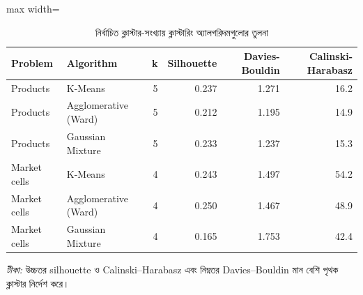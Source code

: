 \begin{table}[htbp]
\centering
\small
\caption{নির্বাচিত ক্লাস্টার-সংখ্যায় ক্লাস্টারিং অ্যালগরিদমগুলোর তুলনা}
\label{tab:clustercompare}
\begin{adjustbox}{max width=\linewidth}
\begin{tabular}{llrrrr}
\toprule
\textbf{Problem} & \textbf{Algorithm} & \textbf{k} & \textbf{Silhouette} & \textbf{Davies-Bouldin} & \textbf{Calinski-Harabasz} \\
\midrule
Products & K-Means & 5 & 0.237 & 1.271 & 16.2 \\
Products & Agglomerative (Ward) & 5 & 0.212 & 1.195 & 14.9 \\
Products & Gaussian Mixture & 5 & 0.233 & 1.237 & 15.3 \\
Market cells & K-Means & 4 & 0.243 & 1.497 & 54.2 \\
Market cells & Agglomerative (Ward) & 4 & 0.250 & 1.467 & 48.9 \\
Market cells & Gaussian Mixture & 4 & 0.165 & 1.753 & 42.4 \\
\bottomrule
\end{tabular}
\end{adjustbox}
\par\smallskip\parbox{0.92\linewidth}{\footnotesize\emph{টীকা:} উচ্চতর silhouette ও Calinski--Harabasz এবং নিম্নতর Davies--Bouldin মান বেশি পৃথক ক্লাস্টার নির্দেশ করে।}
\end{table}